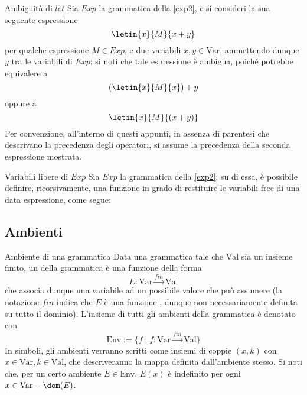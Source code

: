 \documentclass[a4paper, 12pt]{report}
\begin{document}
    \begin{framedobs}{Ambiguità di $let$}
        Sia $Exp$ la grammatica della \cref{exp2}, e si consideri la sua seguente espressione $$\letin{x}{M}{x + y}$$ per qualche espressione $M \in Exp$, e due variabili $x, y \in \mathrm{Var}$, ammettendo dunque $y$ tra le variabili di $Exp$; si noti che tale espressione è ambigua, poiché potrebbe equivalere a $$(\letin{x}{M}{x}) + y$$ oppure a $$\letin{x}{M}{(x + y)}$$ Per convenzione, all'interno di questi appunti, in assenza di parentesi che descrivano la precedenza degli operatori, si assume la precedenza della seconda espressione mostrata.
    \end{framedobs}

    \begin{framedobs}{Variabili libere di $Exp$}
        Sia $Exp$ la grammatica della \cref{exp2}; su di essa, è possibile definire, ricorsivamente, una funzione in grado di restituire le variabili free di una data espressione, come segue: 
    \end{framedobs}

    \subsection{Ambienti}
    
    \begin{frameddefn}[label={env}]{Ambiente di una grammatica}
        Data una grammatica tale che $\mathrm{Val}$ sia un insieme finito, un  della grammatica è una funzione della forma $$E: \mathrm{Var} \xrightarrow{fin} \mathrm{Val}$$ che associa dunque una variabile ad un possibile valore che può assumere (la notazione $fin$ indica che $E$ è una funzione , dunque non necessariamente definita su tutto il dominio). L'insieme di tutti gli ambienti della grammatica è denotato con $$\mathrm{Env} := \{f \mid f : \mathrm{Var} \xrightarrow{fin} \mathrm{Val} \}$$ In simboli, gli ambienti verranno scritti come insiemi di coppie $(x, k)$ con $x \in \mathrm{Var}, k \in \mathrm{Val}$, che descriveranno la mappa definita dall'ambiente stesso. Si noti che, per un certo ambiente $E \in \mathrm{Env}$, $E(x)$ è indefinito per ogni $x \in \mathrm{Var} - \dom(E)$.
    \end{frameddefn}
\end{document}
